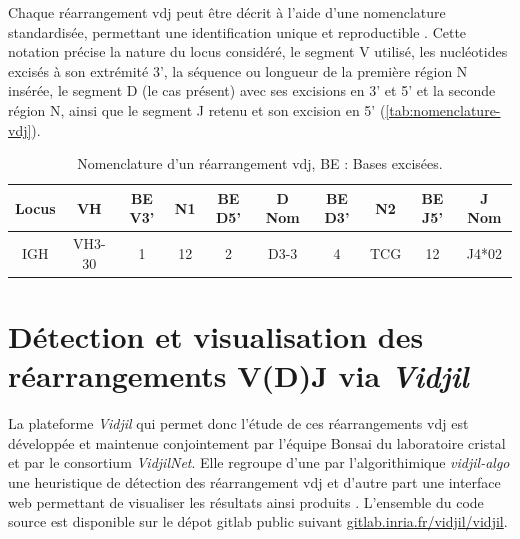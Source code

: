 

Chaque réarrangement \gls{vdj} peut être décrit à l'aide d'une nomenclature standardisée, 
permettant une identification unique et reproductible \cite{laneIMGTONTOLOGYIMGTLIGMotif2010,lefrancIMGT30Years2019}. 
Cette notation précise la nature du locus considéré, le segment V utilisé, les nucléotides excisés à son extrémité 3', 
la séquence ou longueur de la première région N insérée, le segment D (le cas présent) avec ses excisions en 3' et 5' 
et la seconde région N, ainsi que le segment J retenu et son excision en 5' (\autoref{tab:nomenclature-vdj}).

\begin{table}[H]
    \centering
    \caption{Nomenclature d'un réarrangement \gls{vdj}, BE : Bases excisées.}
    \label{tab:nomenclature-vdj}
    \begin{tabular}{c c c c c c c c c c}
        \toprule
        \textbf{Locus} & \textbf{VH} & \textbf{BE V3'} & \textbf{N1} & \textbf{BE D5'} & 
        \textbf{D Nom} & \textbf{BE D3'} & \textbf{N2} & \textbf{BE J5'} & \textbf{J Nom} \\        
        \midrule IGH & VH3-30 & 1 & 12 & 2 & D3-3 & 4 & TCG & 12 & J4*02 \\
        \bottomrule
    \end{tabular}
\end{table}


\section{Détection et visualisation des réarrangements V(D)J via \textit{Vidjil}}

La plateforme \textit{Vidjil} qui permet donc l'étude de ces réarrangements \gls{vdj} est développée et maintenue 
conjointement par l'équipe Bonsai du laboratoire \gls{cristal} et par le consortium \textit{VidjilNet}. 
Elle regroupe d'une par l'algorithimique \textit{vidjil-algo} une heuristique de détection des réarrangement \gls{vdj} 
\cite{giraudFastMulticlonalClusterization2014b} et d'autre part une interface web permettant de visualiser les 
résultats ainsi produits \cite{duezVidjilWebPlatform2016}. L'ensemble du code source est disponible sur le dépot gitlab 
public suivant \href{https://gitlab.inria.fr/vidjil/vidjil}{gitlab.inria.fr/vidjil/vidjil}.

\vspace{1em}

